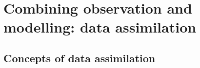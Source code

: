 \documentclass[utf8]{frontiersSCNS} %
\begin{document}



\section{Combining observation and modelling: data assimilation}

\subsection{Concepts of data assimilation}
\end{document}

